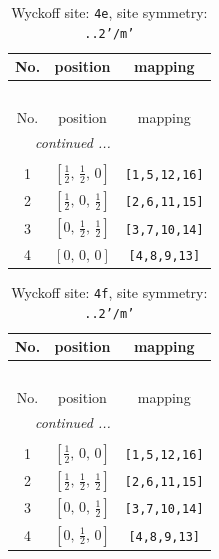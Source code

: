 \documentclass[fleqn,8pt]{jsarticle}
\begin{document}
\renewcommand{\arraystretch}{1.2}
\begin{longtable}{ccc}
\caption{Wyckoff site: {\tt 4e}, site symmetry: {\tt ..2'/m'}}
 \\
 \hline \hline
No. & position & mapping \\ \hline \endfirsthead

\multicolumn{2}{l}{\tablename\ \thetable{}} \\
 \hline \hline
No. & position & mapping \\ \hline \endhead

 \hline \hline
\multicolumn{2}{r}{\footnotesize\it continued ...} \\ \endfoot

 \hline \hline
\multicolumn{2}{r}{} \\ \endlastfoot

1 & $\left[ \frac{1}{2},\, \frac{1}{2},\, 0 \right]$ & {\tt [1,5,12,16]} \\ \hline
2 & $\left[ \frac{1}{2},\, 0,\, \frac{1}{2} \right]$ & {\tt [2,6,11,15]} \\ \hline
3 & $\left[ 0,\, \frac{1}{2},\, \frac{1}{2} \right]$ & {\tt [3,7,10,14]} \\ \hline
4 & $\left[ 0,\, 0,\, 0 \right]$ & {\tt [4,8,9,13]} \\
\end{longtable}
\renewcommand{\arraystretch}{1.2}
\begin{longtable}{ccc}
\caption{Wyckoff site: {\tt 4f}, site symmetry: {\tt ..2'/m'}}
 \\
 \hline \hline
No. & position & mapping \\ \hline \endfirsthead

\multicolumn{2}{l}{\tablename\ \thetable{}} \\
 \hline \hline
No. & position & mapping \\ \hline \endhead

 \hline \hline
\multicolumn{2}{r}{\footnotesize\it continued ...} \\ \endfoot

 \hline \hline
\multicolumn{2}{r}{} \\ \endlastfoot

1 & $\left[ \frac{1}{2},\, 0,\, 0 \right]$ & {\tt [1,5,12,16]} \\ \hline
2 & $\left[ \frac{1}{2},\, \frac{1}{2},\, \frac{1}{2} \right]$ & {\tt [2,6,11,15]} \\ \hline
3 & $\left[ 0,\, 0,\, \frac{1}{2} \right]$ & {\tt [3,7,10,14]} \\ \hline
4 & $\left[ 0,\, \frac{1}{2},\, 0 \right]$ & {\tt [4,8,9,13]} \\
\end{longtable}
\end{document}
